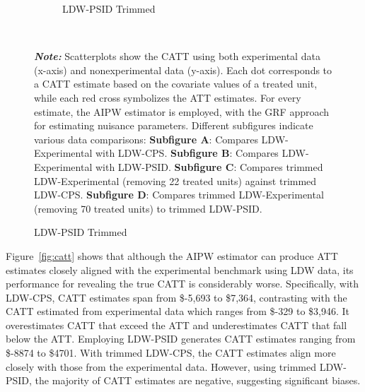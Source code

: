 \documentclass[letterpaper,12pt,leqno]{article}
\begin{document}
\begin{figure}[!ht]
\begin{minipage}[c]{1\textwidth}
\begin{subfigure}{0.45\linewidth}
            \caption{LDW-PSID Trimmed}
        \end{subfigure}
    \end{minipage}%
    \\\raggedright
     {\footnotesize\textbf{\textit{Note:}} Scatterplots show the CATT using both experimental data (x-axis) and nonexperimental data (y-axis). Each dot corresponds to a CATT estimate based on the covariate values of a treated unit, while each red cross symbolizes the ATT estimates. For every estimate, the AIPW estimator is employed, with the GRF approach for estimating nuisance parameters. Different subfigures indicate various data comparisons: \textbf{Subfigure A}: Compares LDW-Experimental with LDW-CPS. \textbf{Subfigure B}: Compares LDW-Experimental with LDW-PSID. \textbf{Subfigure C}: Compares trimmed LDW-Experimental (removing 22 treated units) against trimmed LDW-CPS. \textbf{Subfigure D}: Compares trimmed LDW-Experimental (removing 70 treated units) to trimmed LDW-PSID.}
\end{figure}

Figure~\ref{fig:catt} shows that although the AIPW estimator can produce ATT estimates closely aligned with the experimental benchmark using LDW data, its performance for revealing the true CATT is considerably worse. Specifically, with LDW-CPS, CATT estimates span from \$-5,693 to \$7,364, contrasting with the CATT estimated from experimental data which ranges from \$-329 to \$3,946. It overestimates CATT that exceed the ATT and underestimates CATT that fall below the ATT. Employing LDW-PSID generates CATT estimates ranging from \$-8874 to \$4701. With trimmed LDW-CPS, the CATT estimates align more closely with those from the experimental data. However, using trimmed LDW-PSID, the majority of CATT estimates are negative, suggesting significant biases.
\end{document}
